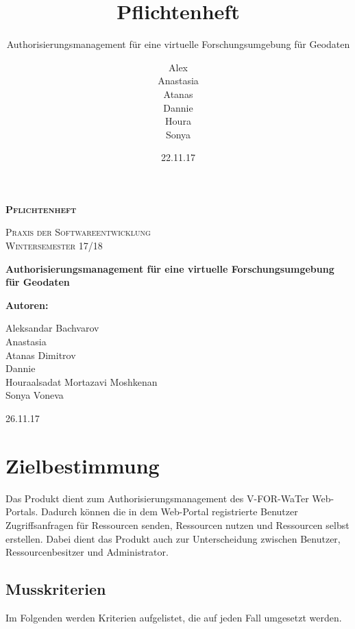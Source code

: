 \documentclass[parskip=full,11pt]{scrartcl}
\title{Pflichtenheft}
\subtitle{Authorisierungsmanagement für eine virtuelle Forschungsumgebung für Geodaten}
\author{Alex\\Anastasia\\Atanas\\Dannie\\ Houra\\Sonya\\}
\date{22.11.17}
\begin{document}
\begin{titlepage}
	
	\begin{center}
	{\scshape\LARGE\bfseries Pflichtenheft \par}
	\vspace{1cm}
	{\scshape\Large Praxis der Softwareentwicklung\\}
	\vspace{1cm}
	{\scshape\Large Wintersemester 17/18\\}
	\vspace{3cm}
	{\huge\bfseries Authorisierungsmanagement für eine virtuelle Forschungsumgebung für Geodaten\par}
	\vspace{2cm}
	\vfill
	{\bfseries {\Large Autoren}:\par}
	{\Large Aleksandar Bachvarov}\\
	{\Large Anastasia}\\%
	{\Large Atanas Dimitrov}\\
	{\Large Dannie}\\%
	{\Large Houraalsadat Mortazavi Moshkenan}\\
	{\Large Sonya Voneva}\\
	\vfill
	{\large 26.11.17 \par}
	\end{center}
\end{titlepage}
\tableofcontents

\newpage
\section{Zielbestimmung}
Das Produkt dient zum Authorisierungsmanagement des \gls{V-FOR-WaTer} Web-Portals. Dadurch können die in dem \gls{Web-Portal} registrierte \gls{Benutzer} Zugriffsanfragen für Ressourcen senden, Ressourcen nutzen und Ressourcen selbst erstellen. Dabei dient das Produkt auch zur Unterscheidung zwischen Benutzer, \gls{Ressourcenbesitzer} und \gls{Administrator}.

\subsection{Musskriterien}
Im Folgenden werden Kriterien aufgelistet, die auf jeden Fall umgesetzt werden.
\end{document}
